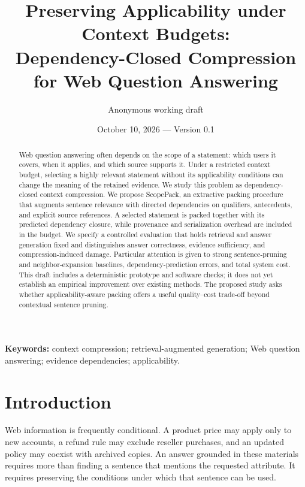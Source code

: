 \documentclass[10pt,twocolumn]{article}
\title{\textbf{Preserving Applicability under Context Budgets:\\Dependency-Closed Compression for Web Question Answering}}
\author{Anonymous working draft}
\date{October 10, 2026 --- Version 0.1}
\newcommand{\method}{ScopePack}
\begin{document}
\maketitle
\begin{center}
\end{center}

\begin{abstract}
Web question answering often depends on the scope of a statement: which users it covers, when it applies, and which source supports it. Under a restricted context budget, selecting a highly relevant statement without its applicability conditions can change the meaning of the retained evidence. We study this problem as dependency-closed context compression. We propose \method, an extractive packing procedure that augments sentence relevance with directed dependencies on qualifiers, antecedents, and explicit source references. A selected statement is packed together with its predicted dependency closure, while provenance and serialization overhead are included in the budget. We specify a controlled evaluation that holds retrieval and answer generation fixed and distinguishes answer correctness, evidence sufficiency, and compression-induced damage. Particular attention is given to strong sentence-pruning and neighbor-expansion baselines, dependency-prediction errors, and total system cost. This draft includes a deterministic prototype and software checks; it does not yet establish an empirical improvement over existing methods. The proposed study asks whether applicability-aware packing offers a useful quality--cost trade-off beyond contextual sentence pruning.
\end{abstract}

\noindent\textbf{Keywords:} context compression; retrieval-augmented generation; Web question answering; evidence dependencies; applicability.

\section{Introduction}
Web information is frequently conditional. A product price may apply only to new accounts, a refund rule may exclude reseller purchases, and an updated policy may coexist with archived copies. An answer grounded in these materials requires more than finding a sentence that mentions the requested attribute. It requires preserving the conditions under which that sentence can be used.
\end{document}
